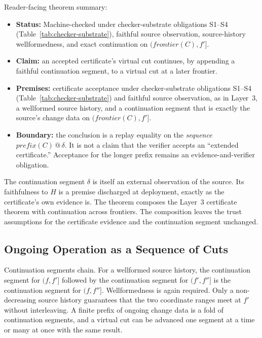 \documentclass[letterpaper,10pt,twocolumn]{article}
\newcommand{\Frontier}{\mathit{frontier}}
\newcommand{\CleanPrefix}{\mathit{prefix}}
\providecommand{\tightlist}{\setlength{\itemsep}{0pt}\setlength{\parskip}{0pt}}
\begin{document}
Reader-facing theorem summary:

\begin{itemize}
\tightlist
\item
  \textbf{Status:} Machine-checked under
  checker-substrate obligations S1--S4
  (Table~\ref{tab:checker-substrate}), faithful source observation,
  source-history wellformedness, and exact continuation on
  $(\Frontier(C),f']$.
\item
  \textbf{Claim:} an accepted certificate's virtual cut continues, by
  appending a faithful continuation segment, to a virtual cut at a later
  frontier.
\item
  \textbf{Premises:} certificate acceptance under checker-substrate
  obligations S1--S4 (Table~\ref{tab:checker-substrate}) and faithful
  source observation, as in Layer~3, a wellformed source history, and a
  continuation segment that is exactly the source's change data on
  $(\Frontier(C),f']$.
\item
  \textbf{Boundary:} the conclusion is a replay equality on the
  \emph{sequence} $\CleanPrefix(C) \mathbin{@} \delta$. It is not a
  claim that the verifier accepts an ``extended certificate.''
  Acceptance for the longer prefix remains an evidence-and-verifier
  obligation.
\end{itemize}

The continuation segment $\delta$ is itself an external observation of
the source. Its faithfulness to $H$ is a premise discharged at
deployment, exactly as the certificate's own evidence is. The theorem
composes the Layer~3 certificate theorem with continuation across
frontiers. The composition leaves the trust assumptions for the
certificate evidence and the continuation segment unchanged.

\subsection{Ongoing Operation as a Sequence of
Cuts}\label{ongoing-operation-as-a-sequence-of-cuts}

Continuation segments chain. For a wellformed source history, the
continuation segment for $(f,f']$ followed by the continuation segment
for $(f',f'']$ is the continuation segment for $(f,f'']$. Wellformedness
is again required. Only a non-decreasing source history guarantees that
the two coordinate ranges meet at $f'$ without interleaving. A finite
prefix of ongoing change data is a fold of continuation segments, and a virtual cut can be
advanced one segment at a time or many at once with the same result.
\end{document}
